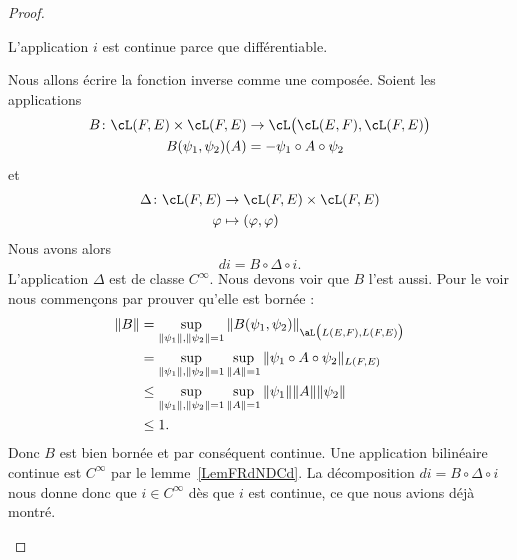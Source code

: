 \begin{proof}
\begin{subproof}

		L'application \( i\) est continue parce que différentiable.

		Nous allons écrire la fonction inverse comme une composée. Soient les applications
		\begin{equation}
			\begin{aligned}
				B\colon \cL(F,E)\times \cL(F,E) & \to \cL\big( \cL(E,F),\cL(F,E) \big) \\
				B(\psi_1,\psi_2)(A)             & = -\psi_1\circ A\circ\psi_2
			\end{aligned}
		\end{equation}
		et
		\begin{equation}
			\begin{aligned}
				\Delta\colon \cL(F,E) & \to \cL(F,E)\times \cL(F,E) \\
				\varphi               & \mapsto (\varphi,\varphi)
			\end{aligned}
		\end{equation}
		Nous avons alors
		\begin{equation}
			di=B\circ\Delta\circ i.
		\end{equation}
		L'application \( \Delta\) est de classe \(  C^{\infty}\). Nous devons voir que \( B\) l'est aussi. Pour le voir nous commençons par prouver qu'elle est bornée :
		\begin{equation}
			\begin{aligned}[]
				\| B \| & =\sup_{\| \psi_1 \|,\| \psi_2 \|=1}\| B(\psi_1,\psi_2) \|_{\aL\big( L(E,F),L(F,E) \big)}      \\
				        & =\sup_{  \| \psi_1 \|,\| \psi_2 \|=1 }\sup_{\| A \|=1}\| \psi_1\circ A\circ\psi_2 \|_{L(F,E)} \\
				        & \leq \sup_{\| \psi_1 \|,\| \psi_2 \|=1}\sup_{\| A \|=1}\| \psi_1 \|\| A \|\| \psi_2 \|        \\
				        & \leq 1.
			\end{aligned}
		\end{equation}
		Donc \( B\) est bien bornée et par conséquent continue. Une application bilinéaire continue est \(  C^{\infty}\) par le lemme~\ref{LemFRdNDCd}. La décomposition \( di=B\circ \Delta\circ i\) nous donne donc que \( i\in C^{\infty}\) dès que \( i\) est continue, ce que nous avions déjà montré.
	\end{subproof}
\end{proof}



